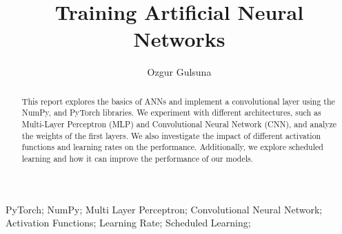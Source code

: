 \documentclass[3p,times,procedia]{elsarticle}
\begin{document}
\begin{frontmatter}





\title{\textbf{Training Artificial Neural Networks}}




\author[]{Ozgur Gulsuna} 

\address[]{Middle East Technical University, Electrical and Electronics Engineering, Ankara, Turkey}

\begin{abstract}
This report explores the basics of ANNs and implement a convolutional layer using the NumPy, and PyTorch libraries. We experiment with different architectures, such as Multi-Layer Perceptron (MLP) and Convolutional Neural Network (CNN), and analyze the weights of the first layers.
We also investigate the impact of different activation functions and learning rates on the performance. Additionally, we explore scheduled learning and how it can improve the performance of our models.
\end{abstract}

\begin{keyword}
PyTorch;
 NumPy;
 Multi Layer Perceptron;
 Convolutional Neural Network;
 Activation Functions;
 Learning Rate;
 Scheduled Learning;
\end{keyword}

\end{frontmatter}
\end{document}
